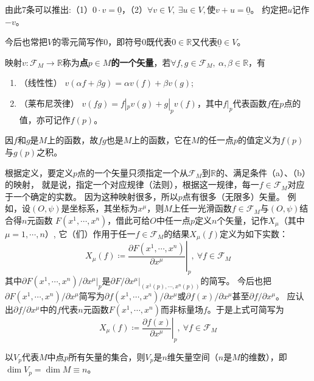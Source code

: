 \begin{note}
由此$7$条可以推出:（1）$0 \cdot v = \underline{0}$，（2）$\forall v \in V, ~ \exists u \in V, \text{使} v + u = \underline{0}$。
约定把$u$记作$-v$。
\end{note}

今后也常把$V$的零元简写作$0$，即符号$0$既代表$0 \in \mathbb{R}$又代表$\underline{0} \in V$。

\begin{definition}
映射$v \colon \mathscr{F}_M \to \mathbb{R}$称为\textbf{点$p \in M$的一个矢量}，若$\forall f, g \in \mathscr{F}_M, ~ \alpha, \beta \in \mathbb{R}$，有
\begin{enumerate}[（a）]
\item （线性性） $v(\alpha f + \beta g) = \alpha v(f) + \beta v(g)$;
\item （莱布尼茨律） $v(fg) = f|_p v(g) + g|_p v(f)$，其中$f|_p$代表函数$f$在$p$点的值，亦可记作$f(p)$。
\end{enumerate}
\end{definition}

\begin{note}
因$f$和$g$是$M$上的函数，故$fg$也是$M$上的函数，它在$M$的任一点$p$的值定义为$f(p)$与$g(p)$之积。
\end{note}

根据定义，要定义$p$点的一个矢量只须指定一个从$\mathscr{F}_M$到$\mathbb{R}$的、满足条件（a）、（b）的映射，
就是说，指定一个对应规律（法则），根据这一规律，每一$f \in \mathscr{F}_M$对应于一个确定的实数。
因为这种映射很多，所以$p$点有很多（无限多）矢量。
例如，设$(O, \psi)$是坐标系，其坐标为$x^\mu$，则$M$上任一光滑函数$f \in \mathscr{F}_M$与$(O, \psi)$结合得$n$元函数
$F(x^1, \cdots, x^n)$，借此可给$O$中任一点$p$定义$n$个矢量，记作$X_\mu$（其中$\mu = 1, \cdots, n$）,
它（们）作用于任一$f \in \mathscr{F}_M$的结果$X_\mu(f)$定义为如下实数：
$$X_\mu(f) \coloneq \left.\frac{\partial F(x^1, \cdots, x^n)}{\partial x^\mu}\right|_p, ~ \forall f \in \mathscr{F}_M$$
其中$\partial F(x^1, \cdots, x^n)/\partial x^\mu|_p$是$\partial F/\partial x^\mu|_{(x^1(p), \cdots, x^n(p))}$的简写。
今后也把$\partial F(x^1, \cdots, x^n)/\partial x^\mu$简写为$\partial f(x^1, \cdots, x^n)/\partial x^\mu$或$\partial f(x)/\partial x^\mu$甚至$\partial f/\partial x^\mu$。
应认出$\partial f/\partial x^\mu$中的$f$代表$n$元函数$F(x^1, \cdots, x^n)$而非标量场$f$。于是上式可简写为
$$X_\mu(f) \coloneq \left.\frac{\partial f(x)}{\partial x^\mu}\right|_p, ~ \forall f \in \mathscr{F}_M$$

\begin{theorem}
以$V_p$代表$M$中点$p$所有矢量的集合，则$V_p$是$n$维矢量空间（$n$是$M$的维数），即$\dim V_p = \dim M \equiv n$。
\end{theorem}

